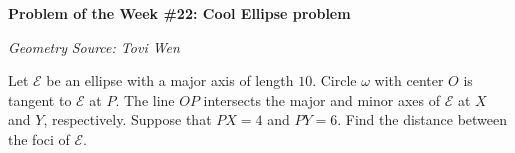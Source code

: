 \begin{potw}\vspace{5pt}
{\large\textbf{Problem of the Week \#22: Cool Ellipse problem}}\vspace{5pt}

\textit{Geometry}\newline
\textit{Source: Tovi Wen}\V

Let $\mathcal{E}$ be an ellipse with a major axis of length $10$. Circle $\omega$ with center $O$ is tangent to $\mathcal{E}$ at $P$. The line $OP$ intersects the major and minor axes of $\mathcal{E}$ at $X$ and $Y$, respectively. Suppose that $PX=4$ and $PY=6$. Find the distance between the foci of $\mathcal{E}$.
\end{potw}\V
